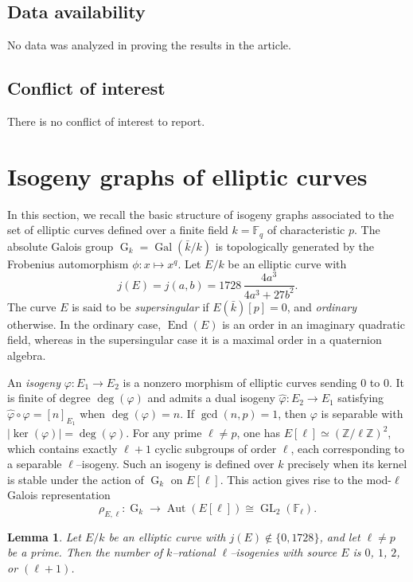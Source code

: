 \documentclass[table]{amsart}
\newtheorem{lemma}[theorem]{Lemma}
\newcommand{\Z}{\mathbb{Z}}
\newcommand{\F}{\mathbb{F}}
\newcommand{\op}[1]{\operatorname{#1}}
\numberwithin{equation}{section}
\begin{document}
\subsection*{Data availability} No data was analyzed in proving the results in the article.

\subsection*{Conflict of interest} There is no conflict of interest to report.

\section{Isogeny graphs of elliptic curves}\label{s2}

\par
In this section, we recall the basic structure of isogeny graphs associated to the set of elliptic curves defined over a finite field $k=\F_q$ of characteristic $p$. The absolute Galois group $\op{G}_k=\op{Gal}(\bar{k}/k)$ is topologically generated by the Frobenius automorphism $\phi:x\mapsto x^q$. Let $E/k$ be an elliptic curve with
\[
j(E)=j(a,b)=1728\,\frac{4a^3}{4a^3+27b^2}.
\]
The curve $E$ is said to be \emph{supersingular} if $E(\bar{k})[p]=0$, and \emph{ordinary} otherwise. In the ordinary case, $\op{End}(E)$ is an order in an imaginary quadratic field, whereas in the supersingular case it is a maximal order in a quaternion algebra.

\par
An \emph{isogeny} $\varphi:E_1\to E_2$ is a nonzero morphism of elliptic curves sending $0$ to $0$. It is finite of degree $\deg(\varphi)$ and admits a dual isogeny $\widehat{\varphi}:E_2\to E_1$ satisfying $\widehat{\varphi}\circ\varphi=[n]_{E_1}$ when $\deg(\varphi)=n$. If $\gcd(n,p)=1$, then $\varphi$ is separable with $|\ker(\varphi)|=\deg(\varphi)$. For any prime $\ell\ne p$, one has $E[\ell]\simeq(\Z/\ell\Z)^2$, which contains exactly $\ell+1$ cyclic subgroups of order $\ell$, each corresponding to a separable $\ell$–isogeny. Such an isogeny is defined over $k$ precisely when its kernel is stable under the action of $\op{G}_k$ on $E[\ell]$. This action gives rise to the mod-$\ell$ Galois representation
\[
\rho_{E,\ell}: \op{G}_k\longrightarrow\op{Aut}(E[\ell])\cong\op{GL}_2(\F_\ell).
\]

\begin{lemma}
Let $E/k$ be an elliptic curve with $j(E)\notin\{0,1728\}$, and let $\ell\ne p$ be a prime. Then the number of $k$–rational $\ell$–isogenies with source $E$ is $0$, $1$, $2$, or $(\ell+1)$.
\end{lemma}
\end{document}
